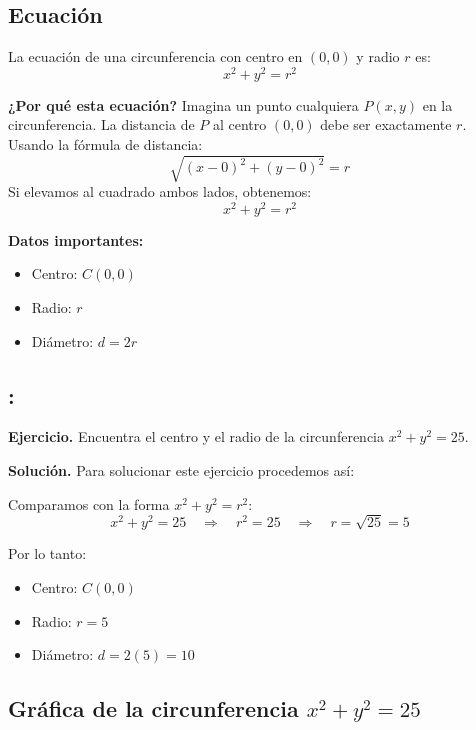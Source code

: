 \documentclass[12pt,a4paper]{article}
\begin{document}
	\subsection*{Ecuación}

	La ecuación de una circunferencia con centro en $(0,0)$ y radio $r$ es:
	\[
	\boxed{x^2+y^2=r^2}
	\]

	\textbf{¿Por qué esta ecuación?} Imagina un punto cualquiera $P(x,y)$ en la circunferencia. La distancia de $P$ al centro $(0,0)$ debe ser exactamente $r$. Usando la fórmula de distancia:
	\[
	\sqrt{(x-0)^2+(y-0)^2}=r
	\]
	Si elevamos al cuadrado ambos lados, obtenemos:
	\[
	x^2+y^2=r^2
	\]

	\bigskip

	\textbf{Datos importantes:}
	\begin{itemize}
		\item Centro: $C(0,0)$
		\item Radio: $r$
		\item Diámetro: $d=2r$
	\end{itemize}

	\subsection*{{\color{blue!50!red}{Ejemplo 1}}: \color{blue!80!black}{Circunferencia con centro en el origen}}

	\textbf{Ejercicio.} Encuentra el centro y el radio de la circunferencia $x^2+y^2=25$.

	\bigskip

	\textbf{Solución.} Para solucionar este ejercicio procedemos así:

	\bigskip

	Comparamos con la forma $x^2+y^2=r^2$:
	\[
	x^2+y^2=25 \quad\Rightarrow\quad r^2=25 \quad\Rightarrow\quad r=\sqrt{25}=5
	\]

	Por lo tanto:
	\begin{itemize}
		\item Centro: $\boxed{C(0,0)}$
		\item Radio: $\boxed{r=5}$
		\item Diámetro: $\boxed{d=2(5)=10}$
	\end{itemize}

	\subsection*{Gráfica de la circunferencia $x^2+y^2=25$}
\end{document}
